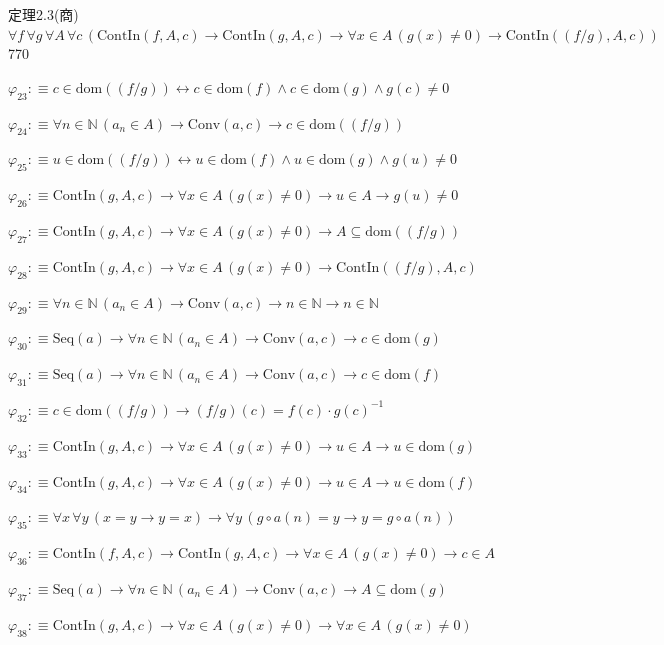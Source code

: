 \begin{fullproof}{定理2.3(商)}{$\forall f\,\forall g\,\forall A\,\forall c\,(\mathrm{ContIn}(f,A,c) \to \mathrm{ContIn}(g,A,c) \to \forall x \in A\,(g(x) \neq 0) \to \mathrm{ContIn}((f / g),A,c))$}{770}
\begin{abbrevlist}
\item $\varphi_{23} :\equiv c \in \mathrm{dom}((f / g)) \leftrightarrow c \in \mathrm{dom}(f) \land c \in \mathrm{dom}(g) \land g(c) \neq 0$
\item $\varphi_{24} :\equiv \forall n \in \mathbb{N}\,(a_{n} \in A) \to \mathrm{Conv}(a,c) \to c \in \mathrm{dom}((f / g))$
\item $\varphi_{25} :\equiv u \in \mathrm{dom}((f / g)) \leftrightarrow u \in \mathrm{dom}(f) \land u \in \mathrm{dom}(g) \land g(u) \neq 0$
\item $\varphi_{26} :\equiv \mathrm{ContIn}(g,A,c) \to \forall x \in A\,(g(x) \neq 0) \to u \in A \to g(u) \neq 0$
\item $\varphi_{27} :\equiv \mathrm{ContIn}(g,A,c) \to \forall x \in A\,(g(x) \neq 0) \to A \subseteq \mathrm{dom}((f / g))$
\item $\varphi_{28} :\equiv \mathrm{ContIn}(g,A,c) \to \forall x \in A\,(g(x) \neq 0) \to \mathrm{ContIn}((f / g),A,c)$
\item $\varphi_{29} :\equiv \forall n \in \mathbb{N}\,(a_{n} \in A) \to \mathrm{Conv}(a,c) \to n \in \mathbb{N} \to n \in \mathbb{N}$
\item $\varphi_{30} :\equiv \mathrm{Seq}(a) \to \forall n \in \mathbb{N}\,(a_{n} \in A) \to \mathrm{Conv}(a,c) \to c \in \mathrm{dom}(g)$
\item $\varphi_{31} :\equiv \mathrm{Seq}(a) \to \forall n \in \mathbb{N}\,(a_{n} \in A) \to \mathrm{Conv}(a,c) \to c \in \mathrm{dom}(f)$
\item $\varphi_{32} :\equiv c \in \mathrm{dom}((f / g)) \to (f / g)(c) = f(c) \cdot g(c)^{-1}$
\item $\varphi_{33} :\equiv \mathrm{ContIn}(g,A,c) \to \forall x \in A\,(g(x) \neq 0) \to u \in A \to u \in \mathrm{dom}(g)$
\item $\varphi_{34} :\equiv \mathrm{ContIn}(g,A,c) \to \forall x \in A\,(g(x) \neq 0) \to u \in A \to u \in \mathrm{dom}(f)$
\item $\varphi_{35} :\equiv \forall x\,\forall y\,(x = y \to y = x) \to \forall y\,(g \circ a(n) = y \to y = g \circ a(n))$
\item $\varphi_{36} :\equiv \mathrm{ContIn}(f,A,c) \to \mathrm{ContIn}(g,A,c) \to \forall x \in A\,(g(x) \neq 0) \to c \in A$
\item $\varphi_{37} :\equiv \mathrm{Seq}(a) \to \forall n \in \mathbb{N}\,(a_{n} \in A) \to \mathrm{Conv}(a,c) \to A \subseteq \mathrm{dom}(g)$
\item $\varphi_{38} :\equiv \mathrm{ContIn}(g,A,c) \to \forall x \in A\,(g(x) \neq 0) \to \forall x \in A\,(g(x) \neq 0)$

\end{abbrevlist}
\end{fullproof}
